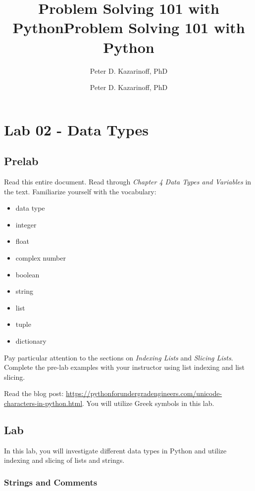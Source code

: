\documentclass[11pt]{article}
\title{Problem Solving 101 with Python}
\author{Peter D. Kazarinoff, PhD}
\date{}
\title{Problem Solving 101 with Python}
\author{Peter D. Kazarinoff, PhD}
\date{}
\providecommand{\tightlist}{%
      \setlength{\itemsep}{0pt}\setlength{\parskip}{0pt}}
\begin{document}
    
    
    

    
    

    
    \hypertarget{lab-02---data-types}{%
\section{Lab 02 - Data Types}\label{lab-02---data-types}}

    \hypertarget{prelab}{%
\subsection{Prelab}\label{prelab}}

Read this entire document. Read through \emph{Chapter 4 Data Types and
Variables} in the text. Familiarize yourself with the vocabulary:

\begin{itemize}
\tightlist
\item
  data type
\item
  integer
\item
  float
\item
  complex number
\item
  boolean
\item
  string
\item
  list
\item
  tuple
\item
  dictionary
\end{itemize}

Pay particular attention to the sections on \emph{Indexing Lists} and
\emph{Slicing Lists}. Complete the pre-lab examples with your instructor
using list indexing and list slicing.

Read the blog post:
\url{https://pythonforundergradengineers.com/unicode-characters-in-python.html}.
You will utilize Greek symbols in this lab.

    \hypertarget{lab}{%
\subsection{Lab}\label{lab}}

In this lab, you will investigate different data types in Python and
utilize indexing and slicing of lists and strings.

    \hypertarget{strings-and-comments}{%
\subsubsection{Strings and Comments}\label{strings-and-comments}}
\end{document}

